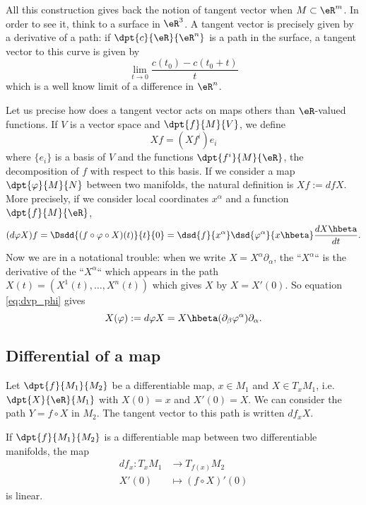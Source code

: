 All this construction gives back the notion of tangent vector when $M\subset \eR^m$. In order to see it, think to a surface in $\eR^3$. A tangent vector is precisely given by a derivative of a path: if $\dpt{c}{\eR}{\eR^n}$ is a path in the surface, a tangent vector to this curve is given by
\[
   \lim_{t\to 0}\frac{c(t_0)-c(t_0+t)}{t}
\]
which is a well know limit of a difference in $\eR^n$.

\label{pg:vecto_vecto}Let us precise how does a tangent vector acts on maps others than $\eR$-valued functions. If $V$ is a vector space and $\dpt{f}{M}{V}$, we define
\[
   Xf=(Xf^i)e_i
\]
where $\{e_i\}$ is a basis of $V$ and the functions $\dpt{f^i}{M}{\eR}$, the decomposition of $f$ with respect to this basis. If we consider a map $\dpt{\varphi}{M}{N}$ between two manifolds, the natural definition is $Xf:=dfX$. More precisely, if we consider local coordinates $x^{\alpha}$ and a function $\dpt{f}{M}{\eR}$,
\begin{equation}\label{eq:dvp_phi}
   (d\varphi X)f=\Dsdd{  (f\circ\varphi\circ X)(t) }{t}{0}=\dsd{f}{x^{\alpha}}\dsd{\varphi^{\alpha}}{x\hbeta}\frac{dX\hbeta}{dt}.
\end{equation}
Now we are in a notational trouble: when we write $X=X^{\alpha}\partial_{\alpha}$, the ``$X^{\alpha}$``{} is the derivative of the ``$X^{\alpha}$``{} which appears in the path $X(t)=(X^1(t),\ldots,X^n(t))$ which gives $X$ by $X=X'(0)$. So equation \eqref{eq:dvp_phi} gives
\begin{equation}
   X(\varphi):=d\varphi X=X\hbeta(\partial_{\beta}\varphi^{\alpha})\partial_{\alpha}.
\end{equation}

\subsection{Differential of a map}

Let $\dpt{f}{M_1}{M_2}$ be a differentiable map, $x\in M_1$ and $X\in T_xM_1$, i.e. $\dpt{X}{\eR}{M_1}$ with $X(0)=x$ and $X'(0)=X$. We can consider the path $Y=f\circ X$ in $M_2$. The tangent vector to this path is written $df_x X$.

\begin{proposition}
If $\dpt{f}{M_1}{M_2}$ is a differentiable map between two differentiable manifolds, the map
		\begin{equation}
		\begin{aligned}
			df_x \colon T_xM_1 &\to T_{f(x)}M_2\\
			X'(0)&\mapsto (f\circ X)'(0)
		\end{aligned}
	\end{equation}
is linear.
\end{proposition}

